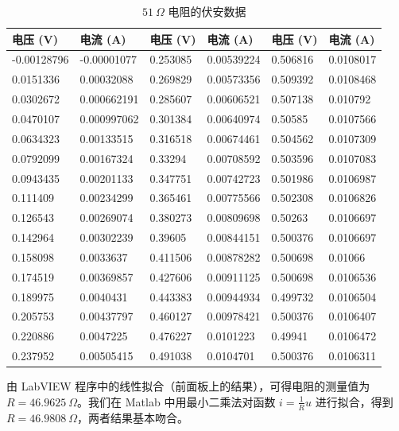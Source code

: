 \documentclass[UTF8]{article}
\theoremstyle{MyLineTheoremStyle} %
\theoremstyle{MyBlockTheoremStyle} %
\theoremstyle{MySubsubsectionStyle} %
\begin{document}
\begin{table}[H]\centering
\caption{$51 \ \Omega $ 电阻的伏安数据}
\label{51欧电阻伏安数据}
\begin{tabular}{|ll|ll|ll|}
    \hline
    电压 (V)  & 电流 (A)   & 电压 (V)  & 电流 (A)   &电压 (V)  & 电流 (A) \\ \hline
    -0.00128796 & -0.00001077   & 0.253085 & 0.00539224 & 0.506816 & 0.0108017  \\ 
    0.0151336   & 0.00032088  & 0.269829 & 0.00573356 & 0.509392 & 0.0108468  \\
    0.0302672   & 0.000662191 & 0.285607 & 0.00606521 & 0.507138 & 0.010792   \\
    0.0470107   & 0.000997062 & 0.301384 & 0.00640974 & 0.50585  & 0.0107566  \\
    0.0634323   & 0.00133515  & 0.316518 & 0.00674461 & 0.504562 & 0.0107309  \\
    0.0792099   & 0.00167324  & 0.33294  & 0.00708592 & 0.503596 & 0.0107083  \\
    0.0943435   & 0.00201133  & 0.347751 & 0.00742723 & 0.501986 & 0.0106987  \\
    0.111409    & 0.00234299  & 0.365461 & 0.00775566 & 0.502308 & 0.0106826  \\
    0.126543    & 0.00269074  & 0.380273 & 0.00809698 & 0.50263  & 0.0106697  \\
    0.142964    & 0.00302239  & 0.39605  & 0.00844151 & 0.500376 & 0.0106697  \\
    0.158098    & 0.0033637   & 0.411506 & 0.00878282 & 0.500698 & 0.01066    \\
    0.174519    & 0.00369857  & 0.427606 & 0.00911125 & 0.500698 & 0.0106536  \\
    0.189975    & 0.0040431   & 0.443383 & 0.00944934 & 0.499732 & 0.0106504  \\
    0.205753    & 0.00437797  & 0.460127 & 0.00978421 & 0.500376 & 0.0106407  \\
    0.220886    & 0.0047225   & 0.476227 & 0.0101223  & 0.49941  & 0.0106472  \\
    0.237952    & 0.00505415  & 0.491038 & 0.0104701  & 0.500376 & 0.0106311  \\
    \hline
\end{tabular}
\end{table}

由 LabVIEW 程序中的线性拟合（前面板上的结果），可得电阻的测量值为 $R = 46.9625\ \Omega$。我们在 Matlab 中用最小二乘法对函数 $i = \frac{1}{R}u$ 进行拟合，得到 $R = 46.9808 \ \Omega$，两者结果基本吻合。
\end{document}
